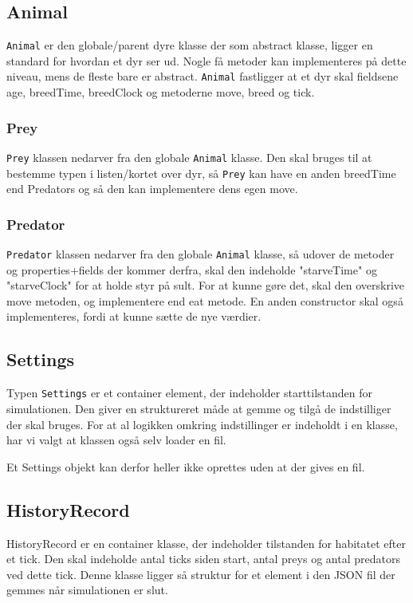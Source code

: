 \documentclass[a4paper]{article}
\begin{document}
    \subsection*{Animal}
      \texttt{Animal} er den globale/parent dyre klasse der som abstract klasse,
      ligger en standard for hvordan et dyr ser ud.
      Nogle få metoder kan implementeres på dette niveau, mens de fleste bare er abstract.
      \texttt{Animal} fastligger at et dyr skal fieldsene age, breedTime, breedClock
      og metoderne move, breed og tick.

      \subsubsection*{Prey}
        \texttt{Prey} klassen nedarver fra den globale \texttt{Animal} klasse.
        Den skal bruges til at bestemme typen i listen/kortet over dyr,
        så \texttt{Prey} kan have en anden breedTime end Predators og så den kan implementere dens egen move.

      \subsubsection*{Predator}
        \texttt{Predator} klassen nedarver fra den globale \texttt{Animal} klasse,
        så udover de metoder og properties+fields der kommer derfra, skal den indeholde "starveTime"
        og "starveClock" for at holde styr på sult. For at kunne gøre det, skal den overskrive move metoden,
        og implementere end eat metode. En anden constructor skal også implementeres, fordi at kunne sætte de nye værdier.

    \subsection*{Settings}
      Typen \texttt{Settings} er et container element, 
      der indeholder starttilstanden for simulationen.
      Den giver en struktureret måde at gemme og tilgå de indstilliger der skal bruges.
      For at al logikken omkring indstillinger er indeholdt i en klasse,
      har vi valgt at klassen også selv loader en fil.

      Et Settings objekt kan derfor heller ikke oprettes uden at der gives en fil.

    \subsection*{HistoryRecord}
      HistoryRecord er en container klasse, der indeholder tilstanden for habitatet efter et tick.
      Den skal indeholde antal ticks siden start, antal preys og antal predators ved dette tick.
      Denne klasse ligger så struktur for et element i den JSON fil der gemmes når simulationen er slut.
\end{document}
